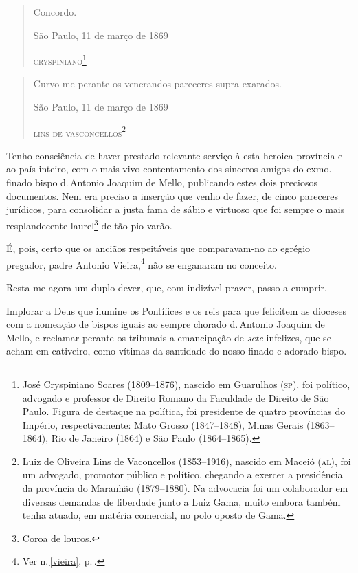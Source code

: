 \begin{quote}
Concordo.

\begin{flushright}
São Paulo, 11 de março de 1869

\textsc{cryspiniano}\footnote{José Cryspiniano Soares (1809--1876),
  nascido em Guarulhos (\textsc{sp}), foi político, advogado e professor de
  Direito Romano da Faculdade de Direito de São Paulo. Figura de
  destaque na política, foi presidente de quatro províncias do Império,
  respectivamente: Mato Grosso (1847--1848), Minas Gerais (1863--1864),
  Rio de Janeiro (1864) e São Paulo (1864--1865).}
\end{flushright}
\end{quote}  

\begin{quote}
Curvo-me perante os venerandos pareceres supra exarados.

\begin{flushright}
São Paulo, 11 de março de 1869

\textsc{lins de vasconcellos}\footnote{Luiz de Oliveira Lins de
  Vaconcellos (1853--1916), nascido em Maceió (\textsc{al}), foi um advogado,
  promotor público e político, chegando a exercer a presidência da
  província do Maranhão (1879--1880). Na advocacia foi um colaborador em
  diversas demandas de liberdade junto a Luiz Gama, muito embora também
  tenha atuado, em matéria comercial, no polo oposto de Gama.}
\end{flushright}
\end{quote}

Tenho consciência de haver prestado relevante serviço à esta heroica
província e ao país inteiro, com o mais vivo contentamento dos sinceros
amigos do exmo.\,finado bispo d.\,Antonio Joaquim de Mello, publicando
estes dois preciosos documentos. Nem era preciso a inserção que venho de
fazer, de cinco pareceres jurídicos, para consolidar a justa fama de
sábio e virtuoso que foi sempre o mais resplandecente laurel\footnote{
  Coroa de louros.} de tão pio varão.

É, pois, certo que os anciãos respeitáveis que comparavam-no ao egrégio
pregador, padre Antonio Vieira,\footnote{Ver n.\,\ref{vieira}, p.\,\pageref{vieira}.} não se enganaram no conceito.

Resta-me agora um duplo dever, que, com indizível prazer, passo a
cumprir.

Implorar a Deus que ilumine os Pontífices e os reis para que felicitem
as dioceses com a nomeação de bispos iguais ao sempre chorado d.\,Antonio
Joaquim de Mello, e reclamar perante os tribunais a emancipação de
\emph{sete} infelizes, que se acham em cativeiro, como vítimas da
santidade do nosso finado e adorado bispo.

